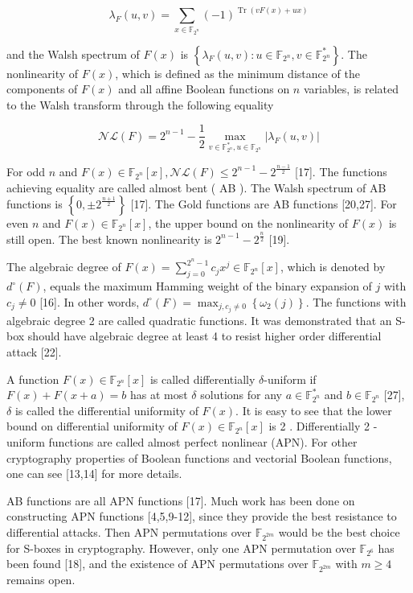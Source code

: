 \documentclass[10pt]{article}
\begin{document}
$$
\lambda_{F}(u, v)=\sum_{x \in \mathbb{F}_{2^{n}}}(-1)^{\operatorname{Tr}(v F(x)+u x)}
$$

and the Walsh spectrum of $F(x)$ is $\left\{\lambda_{F}(u, v): u \in \mathbb{F}_{2^{n}}, v \in \mathbb{F}_{2^{n}}^{*}\right\}$. The nonlinearity of $F(x)$, which is defined as the minimum distance of the components of $F(x)$ and all affine Boolean functions on $n$ variables, is related to the Walsh transform through the following equality

$$
\mathcal{N} \mathcal{L}(F)=2^{n-1}-\frac{1}{2} \max _{v \in \mathbb{F}_{2^{n}}^{*}, u \in \mathbb{F}_{2^{n}}}\left|\lambda_{F}(u, v)\right|
$$

For odd $n$ and $F(x) \in \mathbb{F}_{2^{n}}[x], \mathcal{N} \mathcal{L}(F) \leq 2^{n-1}-2^{\frac{n-1}{2}}$ [17]. The functions achieving equality are called almost bent ( AB ). The Walsh spectrum of AB functions is $\left\{0, \pm 2^{\frac{n+1}{2}}\right\}$ [17]. The Gold functions are AB functions [20,27]. For even $n$ and $F(x) \in \mathbb{F}_{2^{n}}[x]$, the upper bound on the nonlinearity of $F(x)$ is still open. The best known nonlinearity is $2^{n-1}-2^{\frac{n}{2}}$ [19].

The algebraic degree of $F(x)=\sum_{j=0}^{2^{n}-1} c_{j} x^{j} \in \mathbb{F}_{2^{n}}[x]$, which is denoted by $d^{\circ}(F)$, equals the maximum Hamming weight of the binary expansion of $j$ with $c_{j} \neq 0$ [16]. In other words, $d^{\circ}(F)=\max _{j, c_{j} \neq 0}\left\{\omega_{2}(j)\right\}$. The functions with algebraic degree 2 are called quadratic functions. It was demonstrated that an S-box should have algebraic degree at least 4 to resist higher order differential attack [22].

A function $F(x) \in \mathbb{F}_{2^{n}}[x]$ is called differentially $\delta$-uniform if $F(x)+F(x+a)=b$ has at most $\delta$ solutions for any $a \in \mathbb{F}_{2^{n}}^{*}$ and $b \in \mathbb{F}_{2^{n}}$ [27], $\delta$ is called the differential uniformity of $F(x)$. It is easy to see that the lower bound on differential uniformity of $F(x) \in \mathbb{F}_{2^{n}}[x]$ is 2 . Differentially 2 -uniform functions are called almost perfect nonlinear (APN). For other cryptography properties of Boolean functions and vectorial Boolean functions, one can see [13,14] for more details.

AB functions are all APN functions [17]. Much work has been done on constructing APN functions [4,5,9-12], since they provide the best resistance to differential attacks. Then APN permutations over $\mathbb{F}_{2^{2 m}}$ would be the best choice for S-boxes in cryptography. However, only one APN permutation over $\mathbb{F}_{2^{6}}$ has been found [18], and the existence of APN permutations over $\mathbb{F}_{2^{2 m}}$ with $m \geq 4$ remains open.
\end{document}
